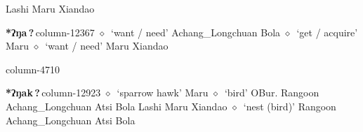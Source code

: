 \hspace{1ex}
         Lashi 
\hspace{1ex}
         Maru 
\hspace{1ex}
         Xiandao 
  \item {\footnotesize \textbf{*ʔŋa\,?\,}}{\tiny column-12367}
         $\diamond$~`want / need'
         Achang\_Longchuan 
\hspace{1ex}
         Bola 
\hspace{1ex}
         $\diamond$~`get / acquire'
         Maru 
\hspace{1ex}
         $\diamond$~`want / need'
         Maru 
\hspace{1ex}
         Xiandao 
  \item {\footnotesize \textbf{}}{\tiny column-4710}
  \item {\footnotesize \textbf{*ʔŋak\,?\,}}{\tiny column-12923}
         $\diamond$~`sparrow hawk'
         Maru 
\hspace{1ex}
         $\diamond$~`bird'
         OBur. 
\hspace{1ex}
         Rangoon 
\hspace{1ex}
         Achang\_Longchuan 
\hspace{1ex}
         Atsi 
\hspace{1ex}
         Bola 
\hspace{1ex}
         Lashi 
\hspace{1ex}
         Maru 
\hspace{1ex}
         Xiandao 
\hspace{1ex}
         $\diamond$~`nest (bird)'
         Rangoon 
\hspace{1ex}
         Achang\_Longchuan 
\hspace{1ex}
         Atsi 
\hspace{1ex}
         Bola 
\hspace{1ex}

